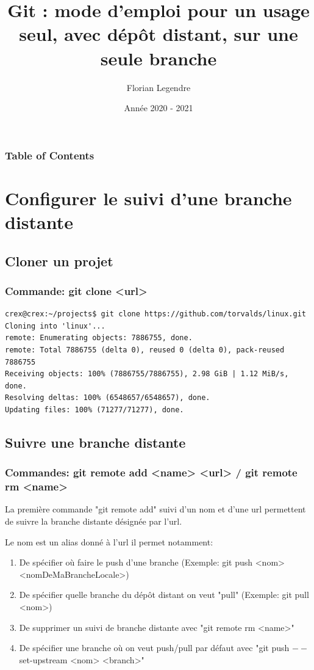 \documentclass{beamer}
\title[Git seul connecté mono-branche]{Git : mode d'emploi pour un usage seul, avec dépôt distant, sur une seule branche}
\author{Florian Legendre}
\institute{Université de Poitiers}
\date{Année 2020 - 2021}
\begin{document}
\frame{\titlepage}

\begin{frame}
\frametitle{Table of Contents}
\tableofcontents[hideallsubsections]
\end{frame}


\section{Configurer le suivi d'une branche distante}

\subsection{Cloner un projet}

\begin{frame}[fragile]
\frametitle{Commande: git clone <url>}
\begin{mdframed}[style=Bash]
    \begin{lstlisting}[style=Bash, caption={Exemple de git clone}]
crex@crex:~/projects$ git clone https://github.com/torvalds/linux.git
Cloning into 'linux'...
remote: Enumerating objects: 7886755, done.
remote: Total 7886755 (delta 0), reused 0 (delta 0), pack-reused 7886755
Receiving objects: 100% (7886755/7886755), 2.98 GiB | 1.12 MiB/s, done.
Resolving deltas: 100% (6548657/6548657), done.
Updating files: 100% (71277/71277), done.
    \end{lstlisting}
    \end{mdframed}
\end{frame}

\subsection{Suivre une branche distante}
\begin{frame}
\frametitle{Commandes: git remote add <name> <url> / git remote rm <name>}
La première commande "git remote add" suivi d'un nom et d'une url permettent de suivre la branche distante désignée par l'url.\\
\smallskip

Le nom est un alias donné à l'url il permet notamment:
\begin{enumerate}
    \item De spécifier où faire le push d'une branche (Exemple: git push <nom> <nomDeMaBrancheLocale>)
    \item De spécifier quelle branche du dépôt distant on veut "pull" (Exemple: git pull <nom>)
    \item De supprimer un suivi de branche distante avec "git remote rm <name>"
    \item De spécifier une branche où on veut push/pull par défaut avec "git push $--$set-upstream <nom> <branch>"
\end{enumerate}
\end{frame}
\end{document}
